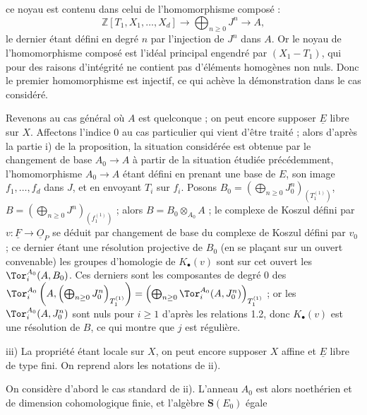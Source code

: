 
ce noyau est contenu dans celui de l'homomorphisme composé :
\[
\mathbb Z[T_1,X_1,\ldots,X_d]\longrightarrow
\bigoplus_{n\ge0}J^n\longrightarrow A,
\]
le dernier étant défini en degré \(n\) par l'injection de \(J^n\) dans \(A\). Or le noyau de l'homomorphisme composé est l'idéal principal engendré par \((X_1-T_1)\), qui pour des raisons d'intégrité ne contient pas d'éléments homogènes non nuls. Donc le premier homomorphisme est injectif, ce qui achève la démonstration dans le cas considéré.

Revenons au cas général où \(A\) est quelconque ; on peut encore supposer \(\underline{E}\) libre sur \(X\). Affectons l'indice \(0\) au cas particulier qui vient d'être traité ; alors d'après la partie i) de la proposition, la situation considérée est obtenue par le changement de base \(A_0\to A\) à partir de la situation étudiée précédemment, l'homomorphisme \(A_0\to A\) étant défini en prenant une base de \(E\), son image \(f_1,\ldots,f_d\) dans \(J\), et en envoyant \(T_i\) sur \(f_i\). Posons \(B_0=\left(\bigoplus_{n\ge0}J_0^n\right)_{(T_1^{(1)})}\), \(B=\left(\bigoplus_{n\ge0}J^n\right)_{(f_1^{(1)})}\) ; alors \(B=B_0\otimes_{A_0}A\) ; le complexe de Koszul défini par \(v:\underline{F}\to\underline{O}_P\) se déduit par changement de base du complexe de Koszul défini par \(v_0\) ; ce dernier étant une résolution projective de \(B_0\) (en se plaçant sur un ouvert convenable) les groupes d'homologie de \(K_\bullet(v)\) sont sur cet ouvert les \(\Tor_i^{A_0}(A,B_0)\). Ces derniers sont les composantes de degré \(0\) des \(\Tor_i^{A_0}\left(A,\left(\bigoplus_{n\ge0}J_0^n\right)_{T_1^{(1)}}\right)=\left(\bigoplus_{n\ge0}\Tor_i^{A_0}(A,J_0^n)\right)_{T_1^{(1)}}\) ; or les \(\Tor_i^{A_0}(A,J_0^n)\) sont nuls pour \(i\ge1\) d'après les relations 1.2, donc \(K_\bullet(v)\) est une résolution de \(B\), ce qui montre que \(j\) est régulière.

iii) La propriété étant locale sur \(X\), on peut encore supposer \(X\) affine et \(\underline{E}\) libre de type fini. On reprend alors les notations de ii).

On considère d'abord le cas standard de ii). L'anneau \(A_0\) est alors noethérien et de dimension cohomologique finie, et l'algèbre \(\mathbf{S}(E_0)\)
égale%
